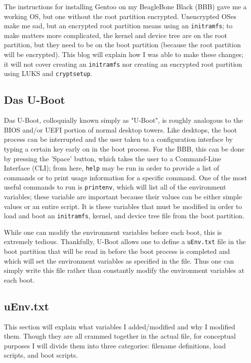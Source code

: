 \documentclass{article}
\begin{document}
The instructions for installing Gentoo on my BeagleBone Black (BBB) gave me a working OS, but one without the root partition encrypted.  Unencrypted OSes make me sad, but an encrypted root partition means using an \texttt{initramfs}; to make matters more complicated, the kernel and device tree are on the root partition, but they need to be on the boot partition (because the root partition will be encrypted).  This blog will explain how I was able to make these changes; it will not cover creating an \texttt{initramfs} nor creating an encrypted root partition using LUKS and \texttt{cryptsetup}.

\subsection{Das U-Boot}
Das U-Boot, colloquially known simply as "U-Boot", is roughly analogous to the BIOS and/or UEFI portion of normal desktop towers.  Like desktops, the boot process can be interrupted and the user taken to a configuration interface by typing a certain key early on in the boot process.  For the BBB, this can be done by pressing the 'Space' button, which takes the user to a Command-Line Interface (CLI); from here, \texttt{help} may be run in order to provide a list of commands or to print usage information for a specific command.  One of the most useful commands to run is \texttt{printenv}, which will list all of the environment variables; these variable are important because their values can be either simple values or an entire script.  It is these variables that must be modified in order to load and boot an \texttt{initramfs}, kernel, and device tree file from the boot partition.

While one can modify the environment variables before each boot, this is extremely tedious.  Thankfully, U-Boot allows one to define a \texttt{uEnv.txt} file in the boot partition that will be read in before the boot process is completed and which will set the environment variables as specified in the file.  Thus one can simply write this file rather than constantly modify the environment variables at each boot.

\subsection{uEnv.txt}
This section will explain what variables I added/modified and why I modified them.  Though they are all crammed together in the actual file, for conceptual purposes I will divide them into three categories: filename definitions, load scripts, and boot scripts.
\end{document}
